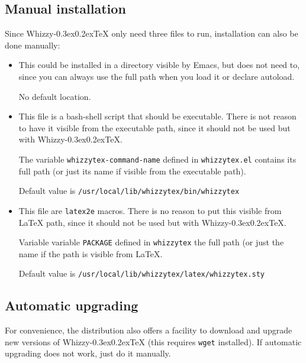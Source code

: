 \documentclass[12pt]{article}
\makeatletter
\let \lst \verb
\def \whizzy {{Whizzy\kern -0.3ex\raise 0.2ex\hbox{\let \@\relax\TeX}}}
\makeatother
\begin{document}
\subsection {Manual installation}

Since {\whizzy} only need three files to run, installation can also be done
manually:
\begin {itemize}

\item[]\hspace{-2em}{\tt whizzytex.el}

This could be installed in a directory visible by Emacs, but does not need
to, since you can always use the full path when you load it or declare
autoload. 

No default location.

\item[]\hspace {-2em}{\tt whizzytex}

This file is a bash-shell script that should be executable.  There is not
reason to have it visible from the executable path, since it should not be
used but with {\whizzy}.

The variable {\tt whizzytex-command-name} defined in {\tt whizzytex.el} 
contains its full path (or just its name if visible from the executable
path). 

Default value is \lst"/usr/local/lib/whizzytex/bin/whizzytex"

\item[]\hspace{-2em}{\tt whizzytex.sty}

This file are {\tt latex2e} macros. There is no reason to put this visible
from {\LaTeX} path, since it should not be used but with {\whizzy}.

Variable variable {\tt PACKAGE} defined in {\tt whizzytex} 
the full path (or just the name if the path is visible from {\LaTeX}. 

Default value is \lst"/usr/local/lib/whizzytex/latex/whizzytex.sty"

\end {itemize}


\subsection {Automatic upgrading}

For convenience, the distribution also offers a facility to download
and upgrade new versions of {\whizzy} (this requires \lst"wget" installed). 
If automatic upgrading does not work, just do it manually.
\end{document}
